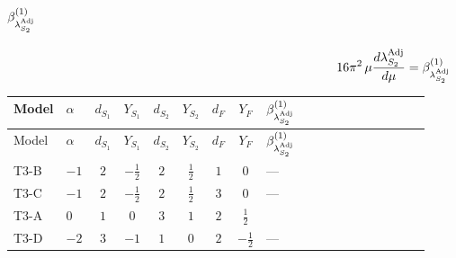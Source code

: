 \documentclass{article}
\begin{document}
\begin{landscape}
\section*{$\beta_{\lambda_{S_2}^{\rm Adj}}^{(1)}$}
\[16\pi^2\,\mu\frac{d \lambda_{S_2}^{\rm Adj}}{d\mu}=\beta_{\lambda_{S_2}^{\rm Adj}}^{(1)}\]
\tiny
\begin{longtable}{@{}llcccccc >{\raggedright\arraybackslash}p{0.54\linewidth}@{}}
\toprule
Model & $\alpha$ & $d_{S_1}$ & $Y_{S_1}$ & $d_{S_2}$ & $Y_{S_2}$ & $d_F$ & $Y_F$ & $\beta_{\lambda_{S_2}^{\rm Adj}}^{(1)}$ \\
\midrule
\endfirsthead
\toprule
Model & $\alpha$ & $d_{S_1}$ & $Y_{S_1}$ & $d_{S_2}$ & $Y_{S_2}$ & $d_F$ & $Y_F$ & $\beta_{\lambda_{S_2}^{\rm Adj}}^{(1)}$ \\
\midrule
\endhead
T3-B & $-1$ & $2$ & $-\frac{1}{2}$ & $2$ & $\frac{1}{2}$ & $1$ & $0$ & --- \\
\midrule
T3-C & $-1$ & $2$ & $-\frac{1}{2}$ & $2$ & $\frac{1}{2}$ & $3$ & $0$ & --- \\
\midrule
T3-A & $0$ & $1$ & $0$ & $3$ & $1$ & $2$ & $\frac{1}{2}$ & \scriptsize\adjustbox{max width=\linewidth}{$\begin{gathered} {\lambda_{S_2}} \left(\frac{1}{2} \operatorname{Tr}\!\left({y_2}\,\left({y_2}\right)^{\dagger}\right)+13 {\lambda_{S_2}^{\rm Adj}}\right) \\ +4 {\lambda_{S_2}^{\rm Adj}} \operatorname{Tr}\!\left({y_2}\,\left({y_2}\right)^{\dagger}\right) \\ -\operatorname{Tr}\!\left({y_2}\,\left({y_2}\right)^{\dagger}\,{y_2}\,\left({y_2}\right)^{\dagger}\right) \\ +\frac{3 {g_2}^4}{4} \\ +{g_Y}^2 \left(9 {g_2}^2-\frac{3 {\lambda_{S_2}}}{2}-12 {\lambda_{S_2}^{\rm Adj}}\right) \\ +{g_2}^2 (-3 {\lambda_{S_2}}-24 {\lambda_{S_2}^{\rm Adj}}) \\ +\frac{3 {g_Y}^4}{2} \\ +\frac{{\lambda_{12}}^2}{4} \\ +\frac{{\lambda_{H2}}^2}{2} \\ +3 {\lambda_{H2}^{\rm Adj}}^2 \\ +\frac{7 {\lambda_{S_2}}^2}{4} \\ +22 {\lambda_{S_2}^{\rm Adj}}^2\end{gathered}$} \\
\midrule
T3-D & $-2$ & $3$ & $-1$ & $1$ & $0$ & $2$ & $-\frac{1}{2}$ & --- \\

\end{longtable}
\end{landscape}
\end{document}
